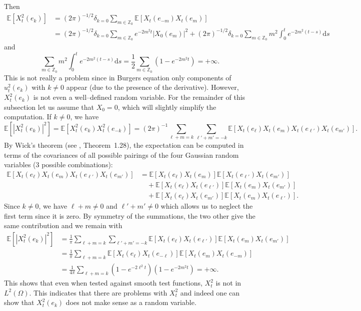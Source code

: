 \documentclass[a4paper,11pt]{article}
\newcommand{\mathd}{\mathrm{d}}
\begin{document}
Then
\begin{align*}
   \mathbb{E} [X_t^2 (e_k)] & = (2 \pi)^{- 1 / 2} \delta_{k = 0} \sum_{m \in \mathbb{Z}_0} \mathbb{E} [X_t (e_{- m}) X_t (e_m)] \\
   & = (2 \pi)^{- 1 / 2} \delta_{k = 0} \sum_{m \in \mathbb{Z}_0} e^{- 2 m^2 t} | X_0 (e_m) |^2 + (2 \pi)^{- 1 / 2} \delta_{k = 0} \sum_{m \in \mathbb{Z}_0} m^2 \int_0^t e^{- 2 m^2 (t - s)} \mathd s
\end{align*}
and
\[ \sum_{m \in \mathbb{Z}_0} m^2 \int_0^t e^{- 2 m^2 (t - s)} \mathd s =
   \frac{1}{2} \sum_{m \in \mathbb{Z}_0} (1 - e^{- 2 m^2 t}) = + \infty . \]
This is not really a problem since in Burgers equation only components of $u^2_t
(e_k)$ with $k \neq 0$ appear (due to the presence of the derivative). However, $X^2_t (e_k)$ is not even a
well--defined random variable. For the remainder of this subsection let us assume that $X_0 = 0$,
which will slightly simplify the computation. If $k \neq 0$, we have
\[ \mathbb{E} [| X^2_t (e_k) |^2] =\mathbb{E} [X^2_t (e_k) X^2_t (e_{- k})]
   = (2 \pi)^{- 1} \sum_{\ell + m = k} \sum_{\ell' + m' = - k} \mathbb{E}
   [X_t (e_{\ell}) X_t (e_m) X_t (e_{\ell'}) X_t (e_{m'})] . \]
By Wick's theorem (see {\cite{Janson1997}}, Theorem~1.28), the expectation can
be computed in terms of the covariances of all possible pairings of the four
Gaussian random variables (3 possible combinations):
\begin{align*}
   \mathbb{E} [X_t (e_{\ell}) X_t (e_m) X_t (e_{\ell'}) X_t (e_{m'})] &=\mathbb{E} [X_t (e_{\ell}) X_t (e_m)] \mathbb{E} [X_t (e_{\ell'}) X_t(e_{m'})] \\
   &\quad + \mathbb{E} [X_t (e_{\ell}) X_t (e_{\ell'})] \mathbb{E} [X_t (e_m) X_t(e_{m'})] \\
   &\quad +\mathbb{E} [X_t (e_{\ell}) X_t (e_{m'})] \mathbb{E} [X_t (e_m) X_t (e_{\ell'})].
\end{align*}
Since $k \neq 0$, we have $\ell + m \neq 0$ and $\ell' + m' \neq 0$ which
allows us to neglect the first term since it is zero. By symmetry of the
summations, the two other give the same contribution and we remain with
\begin{align}\label{eq:OU square variance}
    \mathbb{E} [| X^2_t (e_k) |^2] & = \frac{1}{\pi} \sum_{\ell + m = k} \sum_{\ell' + m' = -k} \mathbb{E} [X_t (e_{\ell}) X_t (e_{\ell'})] \mathbb{E} [X_t (e_m) X_t (e_{m'})] \\ \nonumber
    & =  \frac{1}{\pi} \sum_{\ell + m = k} \mathbb{E} [X_t (e_{\ell}) X_t (e_{- \ell})] \mathbb{E} [X_t (e_m) X_t (e_{- m})] \\ \nonumber
    & = \frac{1}{4\pi} \sum_{\ell + m = k} (1 - e^{- 2 \ell^2 t}) (1 - e^{- 2 m^2 t}) = + \infty.
\end{align}
This shows that even when tested against smooth test functions, $X_t^2$ is not
in $L^2 (\Omega)$. This indicates that there are problems with $X_t^2$ and
indeed one can show that $X_t^2 (e_k)$ does not make sense as a random
variable.
\end{document}
